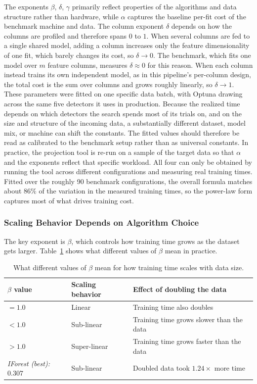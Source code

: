 \documentclass[12pt]{article}
\begin{document}
The exponents $\beta$, $\delta$, $\gamma$ primarily reflect properties of the algorithms and data structure rather than hardware, while $\alpha$ captures the baseline per-fit cost of the benchmark machine and data. The column exponent $\delta$ depends on how the columns are profiled and therefore spans $0$ to $1$. When several columns are fed to a single shared model, adding a column increases only the feature dimensionality of one fit, which barely changes its cost, so $\delta \to 0$. The benchmark, which fits one model over $m$ feature columns, measures $\delta \approx 0$ for this reason. When each column instead trains its own independent model, as in this pipeline's per-column design, the total cost is the sum over columns and grows roughly linearly, so $\delta \to 1$. These parameters were fitted on one specific data batch, with Optuna drawing across the same five detectors it uses in production. Because the realized time depends on which detectors the search spends most of its trials on, and on the size and structure of the incoming data, a substantially different dataset, model mix, or machine can shift the constants. The fitted values should therefore be read as calibrated to the benchmark setup rather than as universal constants. In practice, the projection tool is re-run on a sample of the target data so that $\alpha$ and the exponents reflect that specific workload. All four can only be obtained by running the tool across different configurations and measuring real training times. Fitted over the roughly 90 benchmark configurations, the overall formula matches about 86\% of the variation in the measured training times, so the power-law form captures most of what drives training cost.

\subsubsection{Scaling Behavior Depends on Algorithm Choice}

The key exponent is $\beta$, which controls how training time grows as the dataset gets larger. Table~\ref{tab:beta_meaning} shows what different values of $\beta$ mean in practice.

\begin{table}[!htbp]
\begin{center}
\begin{tabular}{@{}lll@{}}
\toprule
$\beta$ value & Scaling behavior & Effect of doubling the data \\
\midrule
$= 1.0$ & Linear      & Training time also doubles \\
$< 1.0$ & Sub-linear  & Training time grows slower than the data \\
$> 1.0$ & Super-linear & Training time grows faster than the data \\
\midrule
\textit{IForest (best):} $0.307$ & Sub-linear  & Doubled data took $1.24\times$ more time \\
\bottomrule
\end{tabular}
\end{center}
\caption{What different values of $\beta$ mean for how training time scales with data size.}
\label{tab:beta_meaning}
\end{table}
\end{document}
